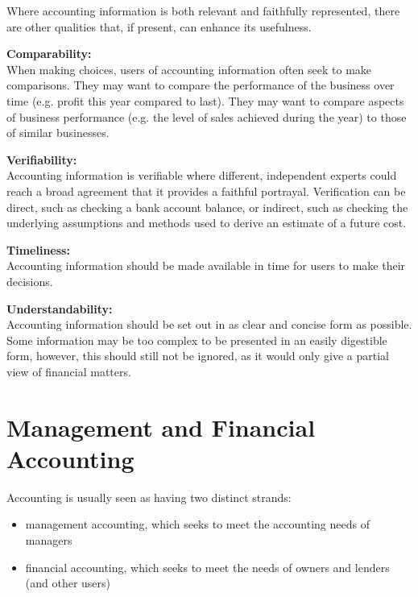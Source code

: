 \documentclass{report}
\newenvironment{blackbox}[1][Black]
  {\begin{tcolorbox}[colframe=#1,colback=white]}
  {\end{tcolorbox}}
\begin{document}
 Where accounting information is both relevant and faithfully represented, there are other qualities that, if present, can enhance its usefulness.
 \begin{blackbox}
     \textbf{Comparability:}\\
     When making choices, users of accounting information often seek to make comparisons. They may want to compare the performance of the business over time (e.g. profit this year compared to last). They may want to compare aspects of business performance (e.g. the level of sales achieved during the year) to those of similar businesses.
 \end{blackbox}

 \begin{blackbox}
     \textbf{Verifiability:}\\
     Accounting information is verifiable where different, independent experts could reach a broad agreement that it provides a faithful portrayal. Verification can be direct, such as checking a bank account balance, or indirect, such as checking the underlying assumptions and methods used to derive an estimate of a future cost.
 \end{blackbox}

 \begin{blackbox}
     \textbf{Timeliness:}\\
     Accounting information should be made available in time for users to make their decisions.
 \end{blackbox}

 \begin{blackbox}
     \textbf{Understandability:}\\
     Accounting information should be set out in as clear and concise form as possible. Some information may be too complex to be presented in an easily digestible form, however, this should still not be ignored, as it would only give a partial view of financial matters.
 \end{blackbox}
\section{Management and Financial Accounting}

Accounting is usually seen as having two distinct strands:
\begin{itemize}
    \item management accounting, which seeks to meet the accounting needs of managers
    \item financial accounting, which seeks to meet the needs of owners and lenders (and other users)\\
\end{itemize}
\end{document}
